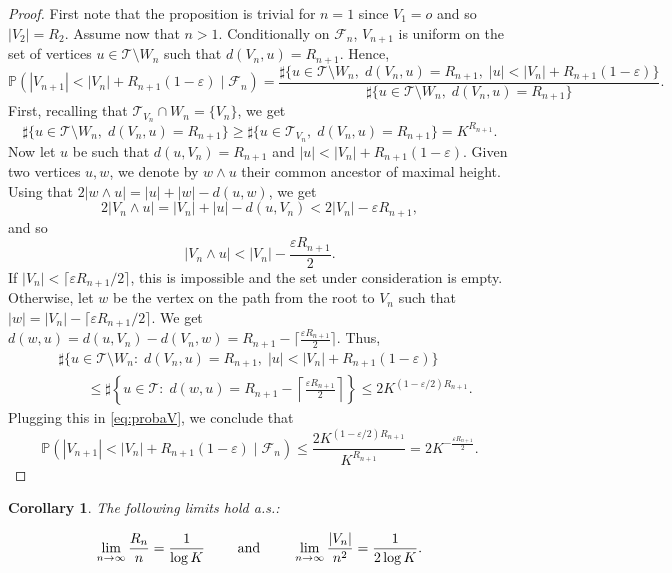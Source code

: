 \documentclass[french]{article}
\newtheorem{corollary}[theorem]{Corollary}
\renewcommand{\P}{\mathbb{P}}
\newcommand{\T}{\mathcal{T}}
\renewcommand{\1}{\mathds{1}}
\begin{document}
\begin{proof} First note that the proposition is trivial for $n=1$ since $V_1=o$ and so $|V_2|=R_2$. Assume now that $n>1$. Conditionally on $\mathcal{F}_n$, $V_{n+1}$ is uniform on the set of vertices $u\in \T\setminus W_n$ such that $d(V_n,u)=R_{n+1}$. Hence,
\begin{equation}\label{eq:probaV}
    \P(|V_{n+1}|< |V_{n}|+R_{n+1}(1-\varepsilon) \mid \mathcal{F}_{n})=\frac{\sharp \{ u\in \T\setminus W_n,\; d(V_n,u)=R_{n+1}, \; |u|<|V_n|+R_{n+1}(1-\varepsilon)\}}{\sharp \{ u\in \T\setminus W_n,\; d(V_n,u)=R_{n+1}\}}.
\end{equation}
    First, recalling that $\T_{V_n} \cap W_n=\{V_n\}$, we get 
    $$\sharp \{ u\in \T\setminus W_n,\; d(V_n,u)=R_{n+1}\}\ge \sharp \{ u\in \T_{V_n}, \;d(V_n,u)=R_{n+1}\}= K^{R_{n+1}}.$$
    Now let $u$ be such that $d(u,V_n)=R_{n+1}$ and $|u|<|V_n|+R_{n+1}(1-\varepsilon)$.
    Given two vertices $u,w$, we denote by $w\wedge u$ their common ancestor of maximal height. Using that $2|w\wedge u|=|u|+|w|-d(u,w)$, we get 
    $$2|V_n\wedge u|= |V_n|+ |u|-d(u,V_n)< 2|V_n|-\varepsilon R_{n+1},$$
     and so 
    $$|V_n\wedge u|< |V_n|-\frac{\varepsilon R_{n+1}}{2}.$$
    If $|V_n|<\lceil\varepsilon R_{n+1}/2\rceil$, this is impossible and the set under consideration is empty. Otherwise, let $w$ be the vertex on the path from the root to $V_n$ such that $|w|=|V_n|-\lceil\varepsilon R_{n+1}/2\rceil$. We get $d(w,u)=d(u,V_n)-d(V_n,w)= R_{n+1}- \lceil\frac{\varepsilon R_{n+1}}{2}\rceil$. Thus,
    \begin{align*}
    &\sharp \{ u\in \T\setminus W_n:\; d(V_n,u)=R_{n+1}, \; |u|<|V_n|+R_{n+1}(1-\varepsilon)\}\\
    &\qquad\le \sharp \left\{ u\in \T:\; d(w,u)=R_{n+1}- \left\lceil{\frac{\varepsilon R_{n+1}}{2}}\right\rceil\right\}
    \le 2K^{(1-\varepsilon/2)R_{n+1}}.
    \end{align*}
    Plugging this in \eqref{eq:probaV}, we conclude that
    \begin{equation*}
    \P(|V_{n+1}|< |V_{n}|+R_{n+1}(1-\varepsilon) \mid \mathcal{F}_{n})\le\frac{2K^{(1-\varepsilon/2)R_{n+1}}}{K^{R_{n+1}}}=2K^{-\frac{\varepsilon R_{n+1}}{2}}.
\end{equation*}
\end{proof}


\begin{corollary}\label{coro:V_nenn2} The following limits hold a.s.:

$$\lim_{n\to \infty} \frac{ R_{n}}{n}=  \frac{1}{\log K}\qquad \hbox{ and }\qquad  \lim_{n\to \infty} \frac{ |V_{n}|}{n^2}=  \frac{1}{2\log K}.$$
\end{corollary}
\end{document}
